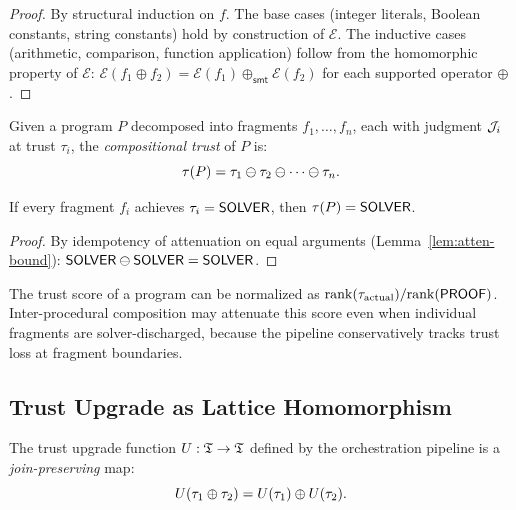 \documentclass[11pt]{article}
\newcommand{\trank}{\mathrm{rank}}
\newcommand{\smtenc}{\mathcal{E}}
\begin{document}
\begin{proof}
By structural induction on $f$.  The base cases (integer literals,
Boolean constants, string constants) hold by construction of $\smtenc$.
The inductive cases (arithmetic, comparison, function application)
follow from the homomorphic property of $\smtenc$:
$\smtenc(f_1 \oplus f_2) = \smtenc(f_1) \oplus_{\mathsf{smt}} \smtenc(f_2)$
for each supported operator $\oplus$.
\end{proof}

\begin{definition}\label{def:comp-trust}
Given a program $P$ decomposed into fragments $f_1, \ldots, f_n$, each
with judgment $\mathcal{J}_i$ at trust $\tau_i$, the \emph{compositional trust}
of $P$ is:
\[
  \tau(P) = \tau_1 \ominus \tau_2 \ominus \cdots \ominus \tau_n.
\]
\end{definition}

\begin{corollary}\label{cor:comp-sound}
If every fragment $f_i$ achieves $\tau_i = \mathsf{SOLVER}$, then
$\tau(P) = \mathsf{SOLVER}$.
\end{corollary}

\begin{proof}
By idempotency of attenuation on equal arguments
(Lemma~\ref{lem:atten-bound}): $\mathsf{SOLVER} \ominus \mathsf{SOLVER} = \mathsf{SOLVER}$.
\end{proof}

\begin{remark}
The trust score of a program can be normalized as
$\trank(\tau_{\mathrm{actual}}) / \trank(\Tproof)$.  Inter-procedural
composition may attenuate this score even when individual fragments are
solver-discharged, because the pipeline conservatively tracks trust loss
at fragment boundaries.
\end{remark}

\subsection{Trust Upgrade as Lattice Homomorphism}\label{sec:trust-homo}

\begin{definition}\label{def:upgrade-homo}
The trust upgrade function $U : \mathfrak{T} \to \mathfrak{T}$ defined by the
orchestration pipeline is a \emph{join-preserving} map:
\[
  U(\tau_1 \oplus \tau_2) = U(\tau_1) \oplus U(\tau_2).
\]
\end{definition}
\end{document}
